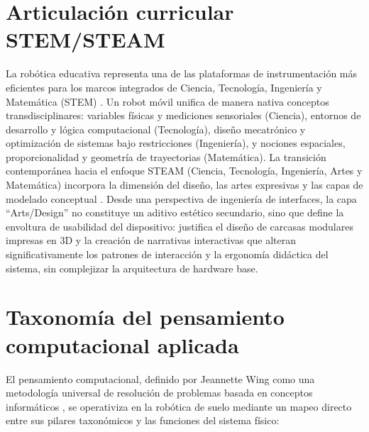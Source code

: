 \documentclass{prgrado}
\begin{document}
\section{Articulación curricular STEM/STEAM}

La robótica educativa representa una de las plataformas de instrumentación más eficientes para los marcos integrados de Ciencia, Tecnología, Ingeniería y Matemática (STEM) \cite{ncsesNDstem}. Un robot móvil unifica de manera nativa conceptos transdisciplinares: variables físicas y mediciones sensoriales (Ciencia), entornos de desarrollo y lógica computacional (Tecnología), diseño mecatrónico y optimización de sistemas bajo restricciones (Ingeniería), y nociones espaciales, proporcionalidad y geometría de trayectorias (Matemática). La transición contemporánea hacia el enfoque STEAM (Ciencia, Tecnología, Ingeniería, Artes y Matemática) incorpora la dimensión del diseño, las artes expresivas y las capas de modelado conceptual \cite{yakman2019steam}.  Desde una perspectiva de ingeniería de interfaces, la capa \enquote{Arts/Design} no constituye un aditivo estético secundario, sino que define la envoltura de usabilidad del dispositivo: justifica el diseño de carcasas modulares impresas en 3D y la creación de narrativas interactivas que alteran significativamente los patrones de interacción y la ergonomía didáctica del sistema, sin complejizar la arquitectura de hardware base.

\section{Taxonomía del pensamiento computacional aplicada}

El pensamiento computacional, definido por Jeannette Wing como una metodología universal de resolución de problemas basada en conceptos informáticos \cite{wing2006computational}, se operativiza en la robótica de suelo mediante un mapeo directo entre sus pilares taxonómicos y las funciones del sistema físico:
\end{document}
